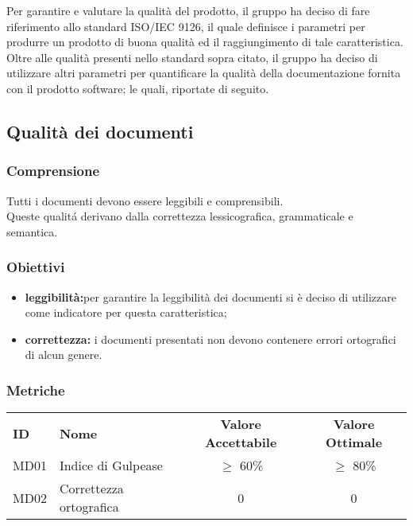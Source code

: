 Per garantire e valutare la qualità del prodotto, il gruppo ha deciso di fare riferimento allo standard ISO/IEC 9126, il quale definisce i parametri per produrre un prodotto di buona qualità ed il raggiungimento di tale caratteristica. \\
Oltre alle qualità presenti nello standard sopra citato, il gruppo ha deciso di utilizzare altri parametri per quantificare la qualità della documentazione fornita con il prodotto software; le quali, riportate di seguito.

\subsection{Qualità dei documenti}

\subsubsection{Comprensione}
Tutti i documenti devono essere leggibili e comprensibili.\\
Queste qualitá derivano dalla correttezza lessicografica, grammaticale e semantica.

\subsubsection{Obiettivi}
\begin{itemize}
    \item \textbf{leggibilità:}per garantire la leggibilità dei documenti si è deciso di utilizzare  come indicatore per questa caratteristica;
    \item \textbf{correttezza:} i documenti presentati non devono contenere errori ortografici di alcun genere.
\end{itemize}

\subsubsection{Metriche}

\begin{table} [h!]
	\begin{center}
		\begin{tabular} {m{2 cm} m{7 cm} c c }
			\rowcolor{lightgray}
			\textbf{ID} & \textbf{Nome}& \textbf{Valore Accettabile} & \textbf{Valore Ottimale}\\
			MD01 & Indice di Gulpease  		 & $\geq$ 60\%    			& $\geq$ 80\% \\
			MD02 & Correttezza ortografica 				&0						&0
		\end{tabular}
	\end{center}
\end{table}